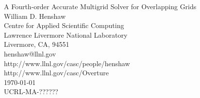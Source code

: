 \documentclass[12pt]{article}
\begin{document}

\newcommand{\ogen}{/home/henshaw/res/ogen}
\newcommand{\figures}{/home/henshaw/Overture/docFigures}
\newcommand{\automg}{/home/henshaw/papers/automg}
\newcommand{\ogmgDir}{/home/henshaw/Overture/ogmg}

\newcommand{\Ogen}{{Ogen}}
\newcommand{\Overture}{{Overture}}
\newcommand{\Ogmg}{{Ogmg}}
\newcommand{\figWidth}{.495\linewidth}
\newcommand{\clipfig}{}
\newcommand{\tablefontsize}{\normalsize}




\vspace{5\baselineskip}
\begin{flushleft}
{\Large
A Fourth-order Accurate Multigrid Solver for Overlapping Grids \\
}
\vspace{3\baselineskip}
William D. Henshaw   \\                    
\vspace{2\baselineskip}
Centre for Applied Scientific Computing \\
Lawrence Livermore National Laboratory    \\
Livermore, CA, 94551   \\
henshaw@llnl.gov \\
http://www.llnl.gov/casc/people/henshaw \\
http://www.llnl.gov/casc/Overture\\
\vspace{2\baselineskip}
\today\\
\vspace{\baselineskip}
UCRL-MA-??????


\vspace{4\baselineskip}

  

\end{flushleft}
\end{document}
